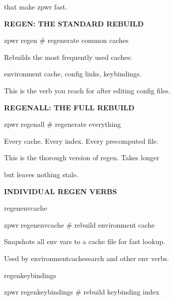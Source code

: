 \documentclass[11pt,a4paper,twoside]{book}
\begin{document}
\begin{codebox}
that make zpwr fast.\\
\end{codebox}


\vspace{12pt}
{\bfseries\color{neonyellow} REGEN: THE STANDARD REBUILD}\vspace{4pt}

\begin{codebox}
zpwr regen                          \# regenerate common caches\\
\end{codebox}

Rebuilds the most frequently used caches:

environment cache, config links, keybindings.

This is the verb you reach for after editing config files.


\vspace{12pt}
{\bfseries\color{neonyellow} REGENALL: THE FULL REBUILD}\vspace{4pt}

\begin{codebox}
zpwr regenall                       \# regenerate everything\\
\end{codebox}

Every cache. Every index. Every precomputed file.

This is the thorough version of regen. Takes longer

but leaves nothing stale.


\vspace{12pt}
{\bfseries\color{neonyellow} INDIVIDUAL REGEN VERBS}\vspace{4pt}

regenenvcache

\begin{codebox}
zpwr regenenvcache                  \# rebuild environment cache\\
\end{codebox}

Snapshots all env vars to a cache file for fast lookup.

Used by environmentcachesearch and other env verbs.

regenkeybindings

\begin{codebox}
zpwr regenkeybindings               \# rebuild keybinding index\\
\end{codebox}
\end{document}
